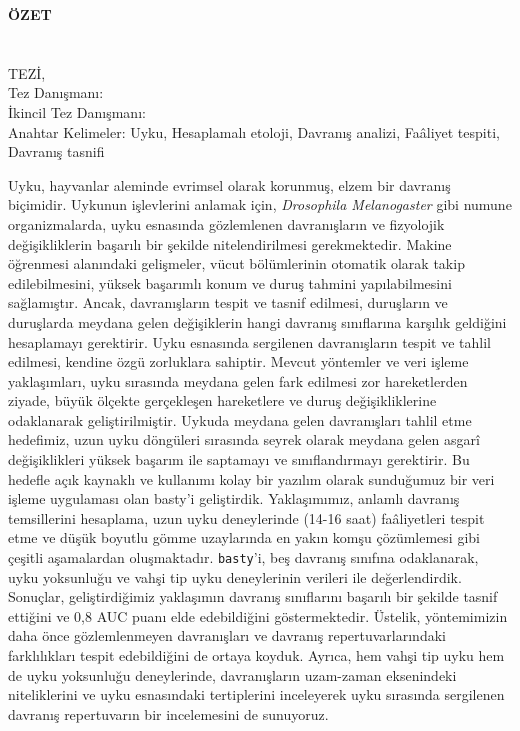 \clearpage\pagebreak
\begin{center}
	\MakeUppercase{\textbf{Özet}} \\ [3\baselineskip]
	\MakeUppercase{\thesistitletr} \\ [3\baselineskip]
	\MakeUppercase{\student} \\[\baselineskip]
	\MakeUppercase{\majortr \degreetr Tez\.{ı}, \monthtr~\year} \\[\baselineskip]
	Tez Danışmanı: \advisortr \\
	İkincil Tez Danışmanı: \coadvisortr \\
	[2\baselineskip]
	Anahtar Kelimeler: Uyku, Hesaplamalı etoloji, Davranış analizi, Faâliyet tespiti, Davranış tasnifi
\end{center}

\singlespacing

Uyku, hayvanlar aleminde evrimsel olarak korunmuş, elzem bir davranış biçimidir.
Uykunun işlevlerini anlamak için, \textit{Drosophila Melanogaster} gibi numune organizmalarda, uyku esnasında gözlemlenen davranışların ve fizyolojik değişikliklerin başarılı bir şekilde nitelendirilmesi gerekmektedir.
Makine öğrenmesi alanındaki gelişmeler, vücut bölümlerinin otomatik olarak takip edilebilmesini, yüksek başarımlı konum ve duruş tahmini yapılabilmesini sağlamıştır.
Ancak, davranışların tespit ve tasnif edilmesi, duruşların ve duruşlarda meydana gelen değişiklerin hangi davranış sınıflarına karşılık geldiğini hesaplamayı gerektirir.
Uyku esnasında sergilenen davranışların tespit ve tahlil edilmesi, kendine özgü zorluklara sahiptir.
Mevcut yöntemler ve veri işleme yaklaşımları, uyku sırasında meydana gelen fark edilmesi zor hareketlerden ziyade, büyük ölçekte gerçekleşen hareketlere ve duruş değişikliklerine odaklanarak geliştirilmiştir.
Uykuda meydana gelen davranışları tahlil etme hedefimiz, uzun uyku döngüleri sırasında seyrek olarak meydana gelen asgarî değişiklikleri yüksek başarım ile saptamayı ve sınıflandırmayı gerektirir.
Bu hedefle açık kaynaklı ve kullanımı kolay bir yazılım olarak sunduğumuz bir veri işleme uygulaması olan basty’i geliştirdik.
Yaklaşımımız, anlamlı davranış temsillerini hesaplama, uzun uyku deneylerinde (14-16 saat) faâliyetleri tespit etme ve düşük boyutlu gömme uzaylarında en yakın komşu çözümlemesi gibi çeşitli aşamalardan oluşmaktadır.
\texttt{basty}'i, beş davranış sınıfına odaklanarak, uyku yoksunluğu ve vahşi tip uyku deneylerinin verileri ile değerlendirdik.
Sonuçlar, geliştirdiğimiz yaklaşımın davranış sınıflarını başarılı bir şekilde tasnif ettiğini ve 0,8 AUC puanı elde edebildiğini göstermektedir.
Üstelik, yöntemimizin daha önce gözlemlenmeyen davranışları ve davranış repertuvarlarındaki farklılıkları tespit edebildiğini de ortaya koyduk.
Ayrıca, hem vahşi tip uyku hem de uyku yoksunluğu deneylerinde, davranışların uzam-zaman eksenindeki niteliklerini ve uyku esnasındaki tertiplerini inceleyerek uyku sırasında sergilenen davranış repertuvarın bir incelemesini de sunuyoruz.

\onehalfspacing
